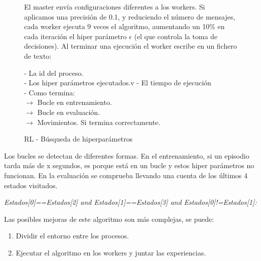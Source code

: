 			
			\begin{figure}			
			\begin{mdframed}[roundcorner=5pt]
				El master envía configuraciones diferentes a los workers. Si aplicamos una precisión de 0.1, y reduciendo el número de mensajes, cada worker ejecuta 9 veces el algoritmo, aumentando un 10\% en cada iteración el hiper parámetro $\epsilon$ (el que controla la toma de decisiones). Al terminar una ejecución el worker escribe en un fichero de texto: 
				
				
				\begin{tcolorbox}[boxrule=0.5pt, fontupper=\small]			
					- La id del proceso. \\
					- Los hiper parámetros ejecutados.v
					- El tiempo de ejecución \\
					- Como termina:\\
					$\rightarrow$ Bucle en entrenamiento.\\
					$\rightarrow$ Bucle en evaluación.\\
					$\rightarrow$ Movimientos. Si termina correctamente.
						
					
				\end{tcolorbox}
				
			\end{mdframed}
			\caption{RL - Búsqueda de hiperparámetros}
			\label{fig:rl_busqueda}
			\end{figure}
			
			Los bucles se detectan de diferentes formas. En el entrenamiento, si un episodio tarda más de x segundos, es porque está en un bucle y estos hiper parámetros no funcionan. En la evaluación se comprueba llevando una cuenta de los últimos 4 estados visitados. 
			\begin{center}
				\textit{Estados[0]==Estados[2] and Estados[1]==Estados[3] and Estados[0]!=Estados[1]: }
			\end{center}
	
	
	
			\begin{flushleft}
				Las posibles mejoras de este algoritmo son más complejas, se puede:		
			\end{flushleft}
			\vspace{-0.9cm}
			\begin{enumerate}
				\item Dividir el entorno entre los procesos.
				\vspace*{-0.2cm}
				\item Ejecutar el algoritmo en los workers y juntar las experiencias.				
			\end{enumerate}
	
